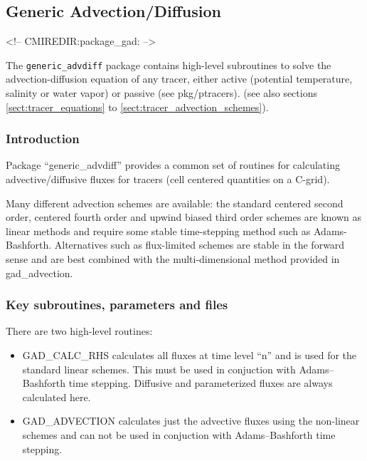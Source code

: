 

\subsection{Generic Advection/Diffusion}
\label{sec:pkg:gad}
\begin{rawhtml}
<!-- CMIREDIR:package_gad: -->
\end{rawhtml}

The {\tt generic\_advdiff} package contains high-level
subroutines to solve the advection-diffusion equation
of any tracer, either active (potential temperature,
salinity or water vapor) or passive (see pkg/ptracers).
(see also sections \ref{sect:tracer_equations} to
\ref{sect:tracer_advection_schemes}).


\subsubsection{Introduction}
Package ``generic\_advdiff'' provides a common set of routines for
calculating advective/diffusive fluxes for tracers (cell centered
quantities on a C-grid).

Many different advection schemes are available: the standard centered
second order, centered fourth order and upwind biased third order
schemes are known as linear methods and require some stable
time-stepping method such as Adams-Bashforth. Alternatives such as
flux-limited schemes are stable in the forward sense and are best
combined with the multi-dimensional method provided in gad\_advection.

\subsubsection{Key subroutines, parameters and files}
\label{sec:pkg:gad:implementation_synopsis}
There are two high-level routines:
\begin{itemize}
\item{GAD\_CALC\_RHS} calculates all fluxes at time level ``n'' and is
  used for the standard linear schemes. This must be used in
  conjuction with Adams--Bashforth time stepping. Diffusive and
  parameterized fluxes are always calculated here.

\item{GAD\_ADVECTION} calculates just the advective fluxes using the
  non-linear schemes and can not be used in conjuction with
  Adams--Bashforth time stepping.
\end{itemize}




